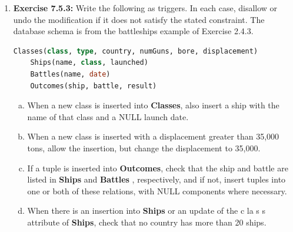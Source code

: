 \documentclass[12pt]{article}
\begin{document}
\begin{enumerate}[1.]
    \item \textbf{Exercise 7.5.3:} Write the following as triggers. In each case, disallow or
    undo the modification if it does not satisfy the stated constraint. The database
    schema is from the battleships example of Exercise 2.4.3.

    \bigskip

    \begin{lstlisting}[language=SQL]
    Classes(class, type, country, numGuns, bore, displacement)
    Ships(name, class, launched)
    Battles(name, date)
    Outcomes(ship, battle, result)
    \end{lstlisting}

    \bigskip

    \begin{enumerate}[a)]
        \item When a new class is inserted into \textbf{Classes}, also insert a ship with the name of that class and a NULL launch date.
        \item When a new class is inserted with a displacement greater than 35,000 tons, allow the insertion, but change the displacement to 35,000.
        \item If a tuple is inserted into \textbf{Outcomes}, check that the ship and battle are listed in \textbf{Ships} and \textbf{Battles} , respectively, and if not, insert tuples into one or both of these relations, with NULL components where necessary.
        \item When there is an insertion into \textbf{Ships} or an update of the c la s s attribute of \textbf{Ships}, check that no country has more than 20 ships.
    \end{enumerate}
\end{enumerate}
\end{document}
